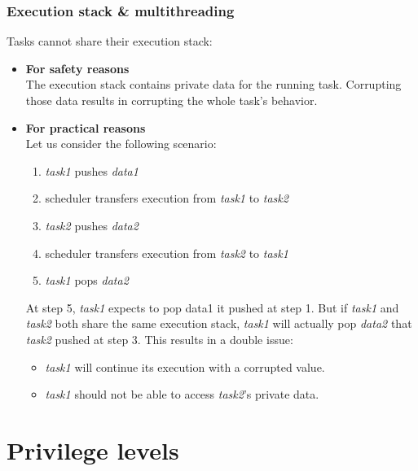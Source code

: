 \begin{frame}
  \frametitle{Execution stack \& multithreading}

  Tasks cannot share their execution stack:

  \begin{itemize}
    \item {\bf For safety reasons}\\
      The execution stack contains private data for the running task.
      Corrupting those data results in corrupting the whole task's behavior.

      \-

    \item {\bf For practical reasons}\\
      Let us consider the following scenario:

      \begin{enumerate}
        \item {\em task1} pushes {\em data1}
	\item scheduler transfers execution from {\em task1} to {\em task2}
	\item {\em task2} pushes {\em data2}
	\item scheduler transfers execution from {\em task2} to {\em task1}
	\item {\em task1} pops {\em data2}
      \end{enumerate}

      \-

      At step 5, {\em task1} expects to pop data1 it pushed at step 1. But if
      {\em task1} and {\em task2} both share the same execution stack,
      {\em task1} will actually pop {\em data2} that {\em task2} pushed at step
      3. This results in a double issue:

      \begin{itemize}
	\item {\em task1} will continue its execution with a corrupted value.
	\item {\em task1} should not be able to access {\em task2}'s private data.
      \end{itemize}

  \end{itemize}

\end{frame}

\section{Privilege levels}

